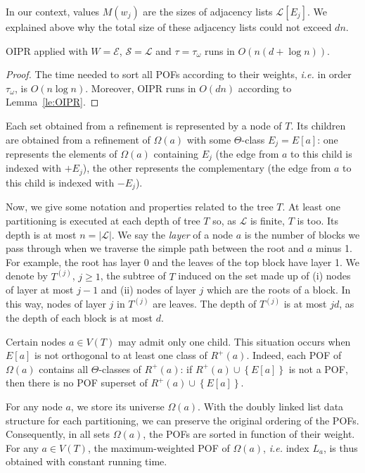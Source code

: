 \documentclass[a4paper,UKenglish,numberwithinsect,cleveref, autoref]{lipics-v2021}
\newcommand{\set}[1]{\left\{ #1 \right\}}
\newcommand{\card}[1]{\left| #1 \right|}
\begin{document}
In our context, values $M(w_j)$ are the sizes of adjacency lists $\mathcal{L}\left[E_j\right]$. We explained above why the total size of these adjacency lists could not exceed $dn$.

\begin{corollary} OIPR applied with $W = \mathcal{E}$, $\mathcal{S} = \mathcal{L}$ and $\tau = \tau_{\omega}$ runs in $O(n(d+\log n))$.
\label{co:oipr}
\end{corollary}
\begin{proof}
The time needed to sort all POFs according to their weights, {\em i.e.} in order $\tau_{\omega}$, is $O(n\log n)$. Moreover, OIPR runs in $O(dn)$  according to Lemma~\ref{le:OIPR}.
\end{proof}

Each set obtained from a refinement is represented by a node of $T$. Its children are obtained from a refinement of $\Omega(a)$ with some $\Theta$-class $E_j=E\left[a\right]$: one represents the elements of $\Omega(a)$ containing $E_j$ (the edge from $a$ to this child is indexed with $+E_j$), the other represents the complementary (the edge from $a$ to this child is indexed with $-E_j$).

Now, we give some notation and properties related to the tree $T$. At least one partitioning is executed at each depth of tree $T$ so, as $\mathcal{L}$ is finite, $T$ is too. Its depth is at most $n = \card{\mathcal{L}}$. 
We say the \textit{layer} of a node $a$ is the number of blocks we pass through when we traverse the simple path between the root and $a$ minus 1. For example, the root has layer 0 and the leaves of the top block have layer 1. We denote by $T^{(j)}$, $j\ge 1$, the subtree of $T$ induced on the set made up of (i) nodes of layer at most $j-1$ and (ii) nodes of layer $j$ which are the roots of a block. In this way, nodes of layer $j$ in $T^{(j)}$ are leaves. The depth of $T^{(j)}$ is at most $jd$, as the depth of each block is at most $d$. 

Certain nodes $a \in V(T)$ may admit only one child. This situation occurs when $E\left[a\right]$ is not orthogonal to at least one class of $R^+(a)$. Indeed, each POF of $\Omega(a)$ contains all $\Theta$-classes of $R^+(a)$: if $R^+(a) \cup \set{E\left[a\right]}$ is not a POF, then there is no POF superset of $R^+(a) \cup \set{E\left[a\right]}$. 

For any node $a$, we store its universe $\Omega(a)$. With the doubly linked list data structure for each partitioning, we can preserve the original ordering of the POFs. Consequently, in all sets $\Omega(a)$, the POFs are sorted in function of their weight. For any $a \in V(T)$, the maximum-weighted POF of $\Omega(a)$, {\em i.e.} index $L_a$, is thus obtained with constant running time.
\end{document}
